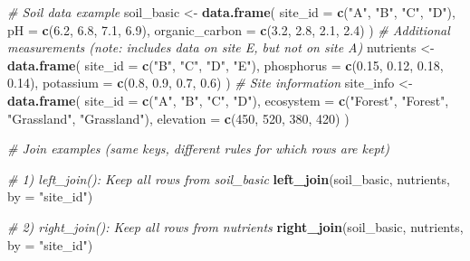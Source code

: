 \documentclass[
  10pt,
  b5paper,
  oneside]{book}
\newenvironment{Shaded}{\begin{snugshade}}{\end{snugshade}}
\newcommand{\AttributeTok}[1]{\textcolor[rgb]{0.13,0.29,0.53}{#1}}
\newcommand{\CommentTok}[1]{\textcolor[rgb]{0.56,0.35,0.01}{\textit{#1}}}
\newcommand{\DecValTok}[1]{\textcolor[rgb]{0.00,0.00,0.81}{#1}}
\newcommand{\FloatTok}[1]{\textcolor[rgb]{0.00,0.00,0.81}{#1}}
\newcommand{\FunctionTok}[1]{\textcolor[rgb]{0.13,0.29,0.53}{\textbf{#1}}}
\newcommand{\NormalTok}[1]{#1}
\newcommand{\OtherTok}[1]{\textcolor[rgb]{0.56,0.35,0.01}{#1}}
\newcommand{\StringTok}[1]{\textcolor[rgb]{0.31,0.60,0.02}{#1}}
\begin{document}
\begin{Shaded}
\begin{Highlighting}[]
\CommentTok{\# Soil data example}
\NormalTok{soil\_basic }\OtherTok{\textless{}{-}} \FunctionTok{data.frame}\NormalTok{(}
 \AttributeTok{site\_id =} \FunctionTok{c}\NormalTok{(}\StringTok{"A"}\NormalTok{, }\StringTok{"B"}\NormalTok{, }\StringTok{"C"}\NormalTok{, }\StringTok{"D"}\NormalTok{),}
 \AttributeTok{pH =} \FunctionTok{c}\NormalTok{(}\FloatTok{6.2}\NormalTok{, }\FloatTok{6.8}\NormalTok{, }\FloatTok{7.1}\NormalTok{, }\FloatTok{6.9}\NormalTok{),}
 \AttributeTok{organic\_carbon =} \FunctionTok{c}\NormalTok{(}\FloatTok{3.2}\NormalTok{, }\FloatTok{2.8}\NormalTok{, }\FloatTok{2.1}\NormalTok{, }\FloatTok{2.4}\NormalTok{)}
\NormalTok{)}
\CommentTok{\# Additional measurements (note: includes data on site E, but not on site A)}
\NormalTok{nutrients }\OtherTok{\textless{}{-}} \FunctionTok{data.frame}\NormalTok{(}
 \AttributeTok{site\_id =} \FunctionTok{c}\NormalTok{(}\StringTok{"B"}\NormalTok{, }\StringTok{"C"}\NormalTok{, }\StringTok{"D"}\NormalTok{, }\StringTok{"E"}\NormalTok{),}
 \AttributeTok{phosphorus =} \FunctionTok{c}\NormalTok{(}\FloatTok{0.15}\NormalTok{, }\FloatTok{0.12}\NormalTok{, }\FloatTok{0.18}\NormalTok{, }\FloatTok{0.14}\NormalTok{),}
 \AttributeTok{potassium =} \FunctionTok{c}\NormalTok{(}\FloatTok{0.8}\NormalTok{, }\FloatTok{0.9}\NormalTok{, }\FloatTok{0.7}\NormalTok{, }\FloatTok{0.6}\NormalTok{)}
\NormalTok{)}
\CommentTok{\# Site information}
\NormalTok{site\_info }\OtherTok{\textless{}{-}} \FunctionTok{data.frame}\NormalTok{(}
 \AttributeTok{site\_id =} \FunctionTok{c}\NormalTok{(}\StringTok{"A"}\NormalTok{, }\StringTok{"B"}\NormalTok{, }\StringTok{"C"}\NormalTok{, }\StringTok{"D"}\NormalTok{),}
 \AttributeTok{ecosystem =} \FunctionTok{c}\NormalTok{(}\StringTok{"Forest"}\NormalTok{, }\StringTok{"Forest"}\NormalTok{, }\StringTok{"Grassland"}\NormalTok{, }\StringTok{"Grassland"}\NormalTok{),}
 \AttributeTok{elevation =} \FunctionTok{c}\NormalTok{(}\DecValTok{450}\NormalTok{, }\DecValTok{520}\NormalTok{, }\DecValTok{380}\NormalTok{, }\DecValTok{420}\NormalTok{)}
\NormalTok{)}

\CommentTok{\# Join examples (same keys, different rules for which rows are kept)}

\CommentTok{\# 1) \textasciigrave{}left\_join()\textasciigrave{}: Keep all rows from soil\_basic}
\FunctionTok{left\_join}\NormalTok{(soil\_basic, nutrients, }\AttributeTok{by =} \StringTok{"site\_id"}\NormalTok{)}

\CommentTok{\# 2) \textasciigrave{}right\_join()\textasciigrave{}: Keep all rows from nutrients}
\FunctionTok{right\_join}\NormalTok{(soil\_basic, nutrients, }\AttributeTok{by =} \StringTok{"site\_id"}\NormalTok{)}


\end{Highlighting}
\end{Shaded}
\end{document}
